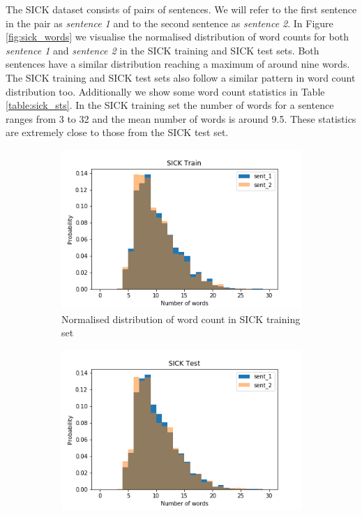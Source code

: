 \begin{enumerate}
The SICK dataset consists of pairs of sentences. We will refer to the first sentence in the pair as \emph{sentence 1} and to the second sentence as \emph{sentence 2}. In Figure \ref{fig:sick_words} we visualise the normalised distribution of word counts for both \emph{sentence 1} and \emph{sentence 2} in the SICK training and SICK test sets. Both sentences have a similar distribution reaching a maximum of around nine words. The SICK training and SICK test sets also follow a similar pattern in word count distribution too. Additionally we show some word count statistics in Table \ref{table:sick_sts}. In the SICK training set the number of words for a sentence ranges from 3 to 32 and the mean number of words is around 9.5. These statistics are extremely close to those from the SICK test set. 


\begin{figure}
	\captionsetup[subfigure]{justification=centering}
	\centering
	\begin{subfigure}[b]{.5\textwidth}
		\centering
		\includegraphics[width=\textwidth]{figures/semantic_textual_similarity/introduction/sick_train_words.png}
		\caption{Normalised distribution of word count in SICK training set}
		\label{fig:sick_train_words}
	\end{subfigure}%
	\begin{subfigure}[b]{.5\textwidth}
		\centering
		\includegraphics[width=\textwidth]{figures/semantic_textual_similarity/introduction/sick_test_words.png}

\end{subfigure}
\end{figure}
\end{enumerate}
